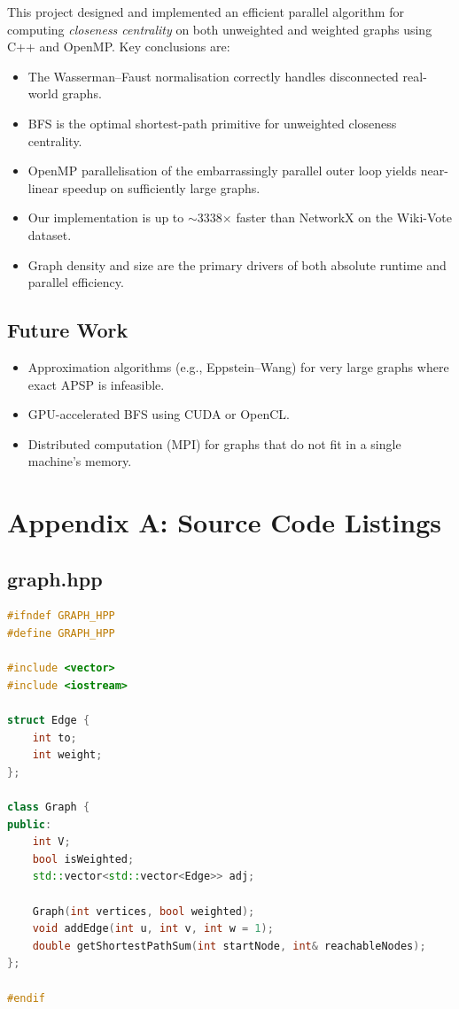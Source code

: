 \documentclass[12pt,a4paper]{article}
\begin{document}
This project designed and implemented an efficient parallel algorithm for computing
\emph{closeness centrality} on both unweighted and weighted graphs using C++ and OpenMP.
Key conclusions are:

\begin{itemize}
  \item The Wasserman--Faust normalisation correctly handles disconnected real-world graphs.
  \item BFS is the optimal shortest-path primitive for unweighted closeness centrality.
  \item OpenMP parallelisation of the embarrassingly parallel outer loop yields near-linear
        speedup on sufficiently large graphs.
  \item Our implementation is up to $\sim$3338$\times$ faster than NetworkX on the
        Wiki-Vote dataset.
  \item Graph density and size are the primary drivers of both absolute runtime and parallel
        efficiency.
\end{itemize}

\subsection{Future Work}
\begin{itemize}
  \item Approximation algorithms (e.g., Eppstein--Wang) for very large graphs where exact
        APSP is infeasible.
  \item GPU-accelerated BFS using CUDA or OpenCL.
  \item Distributed computation (MPI) for graphs that do not fit in a single machine's
        memory.
\end{itemize}

\section*{Appendix A: Source Code Listings}

\subsection*{graph.hpp}
\begin{lstlisting}[language=C++, caption={graph.hpp --- Graph class declaration}]
#ifndef GRAPH_HPP
#define GRAPH_HPP

#include <vector>
#include <iostream>

struct Edge {
    int to;
    int weight;
};

class Graph {
public:
    int V;
    bool isWeighted;
    std::vector<std::vector<Edge>> adj;

    Graph(int vertices, bool weighted);
    void addEdge(int u, int v, int w = 1);
    double getShortestPathSum(int startNode, int& reachableNodes);
};

#endif
\end{lstlisting}
\end{document}
